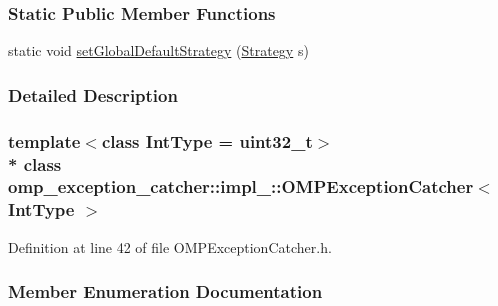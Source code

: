 \subsubsection*{Static Public Member Functions}
\begin{DoxyCompactItemize}
\item 
static void \hyperlink{classomp__exception__catcher_1_1impl___1_1OMPExceptionCatcher_a9e23eceb903ce74ba259ea3833b9f370}{set\+Global\+Default\+Strategy} (\hyperlink{classomp__exception__catcher_1_1impl___1_1OMPExceptionCatcher_ab73d40c948b8be83af2f416075e47a45}{Strategy} s)
\end{DoxyCompactItemize}


\subsubsection{Detailed Description}
\subsubsection*{template$<$class Int\+Type = uint32\+\_\+t$>$\\*
class omp\+\_\+exception\+\_\+catcher\+::impl\+\_\+\+::\+O\+M\+P\+Exception\+Catcher$<$ Int\+Type $>$}



Definition at line 42 of file O\+M\+P\+Exception\+Catcher.\+h.



\subsubsection{Member Enumeration Documentation}

